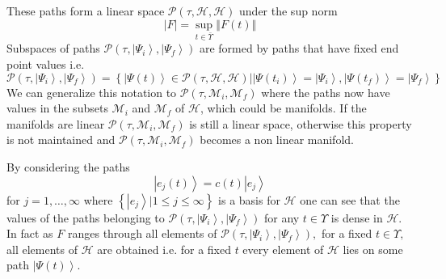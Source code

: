 \documentclass[aps,preprint]{revtex4}
\begin{document}
These paths form a linear space $\mathcal{P}\left( \tau ,\mathcal{H},%
\mathcal{H}\right) $ under the sup norm 
\begin{equation}
\left\vert F\right\vert =\sup_{t\in \bar{\Upsilon}}\left\Vert F\left(
t\right) \right\Vert 
\end{equation}%
Subspaces of paths $\mathcal{P}\left( \tau ,\left\vert \Psi
_{i}\right\rangle ,\left\vert \Psi _{f}\right\rangle \right) $ are formed by
paths that have fixed end point values i.e. 
\begin{equation}
\mathcal{P}\left( \tau ,\left\vert \Psi _{i}\right\rangle ,\left\vert \Psi
_{f}\right\rangle \right) =\left\{ \left\vert \Psi \left( t\right)
\right\rangle \in \mathcal{P}\left( \tau ,\mathcal{H},\mathcal{H}\right)
|\left\vert \Psi \left( t_{i}\right) \right\rangle =\left\vert \Psi
_{i}\right\rangle ,\left\vert \Psi \left( t_{f}\right) \right\rangle
=\left\vert \Psi _{f}\right\rangle \right\} 
\end{equation}%
We can generalize this notation to $\mathcal{P}\left( \tau ,\mathcal{M}_{i},%
\mathcal{M}_{f}\right) $ where the paths now have values in the subsets $%
\mathcal{M}_{i}$ and $\mathcal{M}_{f}$ of $\mathcal{H}$, which could be
manifolds. If the manifolds are linear $\mathcal{P}\left( \tau ,\mathcal{M}%
_{i},\mathcal{M}_{f}\right) $ is still a linear space, otherwise this
property is not maintained and $\mathcal{P}\left( \tau ,\mathcal{M}_{i},%
\mathcal{M}_{f}\right) $ becomes a non linear manifold.

By considering the paths 
\begin{equation}
\left\vert e_{j}\left( t\right) \right\rangle =c\left( t\right) \left\vert
e_{j}\right\rangle
\end{equation}
for $j=1,\ldots,\infty$ where $\left\{ \left\vert e_{j}\right\rangle |1\leq
j\leq\infty\right\} $ is a basis for $\mathcal{H}$ one can see that the
values of the paths belonging to $\mathcal{P}\left( \tau,\left\vert \Psi
_{i}\right\rangle ,\left\vert \Psi_{f}\right\rangle \right) $ for any $%
t\in\Upsilon$ is dense in $\mathcal{H}$. In fact as $F$ ranges through all
elements of $\mathcal{P}\left( \tau,\left\vert \Psi_{i}\right\rangle
,\left\vert \Psi_{f}\right\rangle \right) ,$ for a fixed $t\in\Upsilon,$ all
elements of $\mathcal{H}$ are obtained i.e. for a fixed $t$ every element of 
$\mathcal{H}$ lies on some path $\left\vert \Psi\left( t\right)
\right\rangle $.
\end{document}
